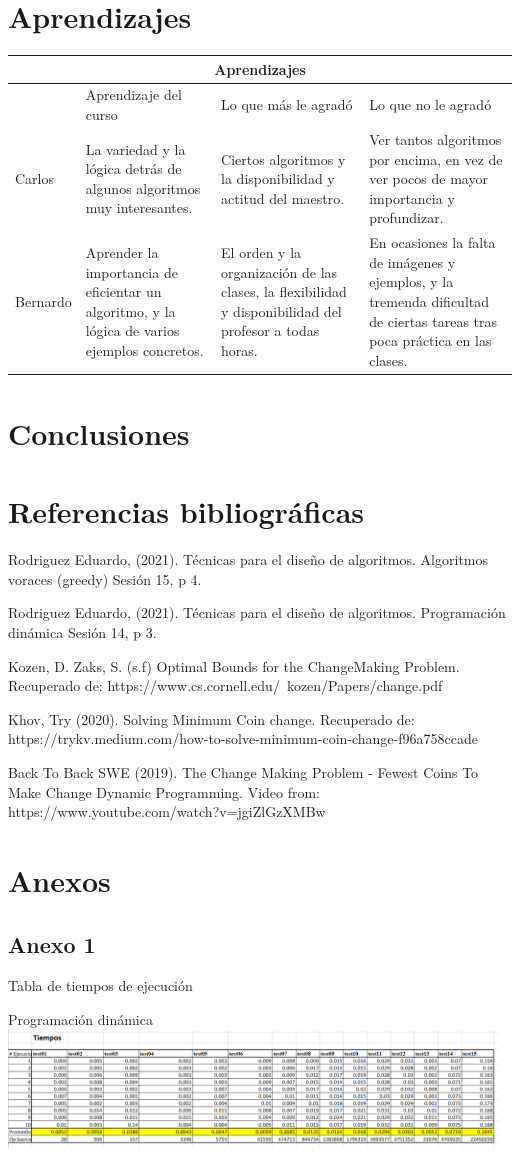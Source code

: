 \documentclass[12pt,letterpaper, titlepage, onecolumn]{article}
\begin{document}
\section{Aprendizajes}
\begin{tabular}{ |p{2cm}|p{4cm}|p{4cm}|p{4cm}| }
	\hline
	\multicolumn{4}{|c|}{Aprendizajes} \\
	\hline
	& Aprendizaje del curso &	Lo que más le agradó &	Lo que no le agradó \\
	\hline
	Carlos & La variedad y la lógica detrás de algunos algoritmos muy interesantes. & Ciertos algoritmos y la disponibilidad y actitud del maestro. & Ver tantos algoritmos por encima, en vez de ver pocos de mayor importancia y profundizar.\\
	\hline
	Bernardo & Aprender la importancia de eficientar un algoritmo, y la lógica de varios ejemplos concretos.  & El orden y la organización de las clases, la flexibilidad y disponibilidad del profesor a todas horas.  & En ocasiones la falta de imágenes y ejemplos, y la tremenda dificultad de ciertas tareas tras poca práctica en las clases.\\
	\hline
\end{tabular}

\section{Conclusiones}
	
\section{Referencias bibliográficas}
	\par Rodriguez Eduardo, (2021). Técnicas para el diseño de algoritmos. Algoritmos voraces (greedy) Sesión 15, p 4.
	\par Rodriguez Eduardo, (2021). Técnicas para el diseño de algoritmos. Programación dinámica Sesión 14, p 3.
	\par Kozen, D. Zaks, S. (s.f) Optimal Bounds for the ChangeMaking Problem. Recuperado de: https://www.cs.cornell.edu/~kozen/Papers/change.pdf
	\par Khov, Try (2020). Solving Minimum Coin change. Recuperado de: https://trykv.medium.com/how-to-solve-minimum-coin-change-f96a758ccade
	\par Back To Back SWE (2019). The Change Making Problem - Fewest Coins To Make Change Dynamic Programming. Video from: \\https://www.youtube.com/watch?v=jgiZlGzXMBw

\section{Anexos}
	\subsection{Anexo 1}
		\par Tabla de tiempos de ejecución
		\par Programación dinámica\\
		\includegraphics[width= 130mm]{img/TiemposDP.png}

\end{document}

